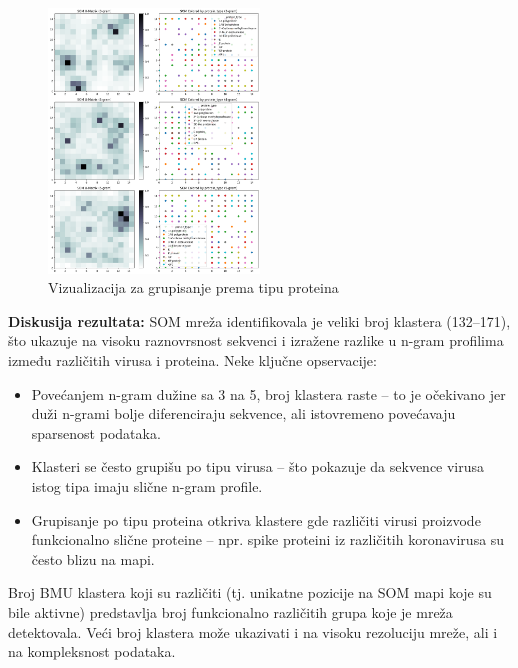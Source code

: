 \documentclass[a4paper,12pt]{article}
\begin{document}
\begin{figure}[h!]
    \centering
    \includegraphics[width=0.5\textwidth]{images/som-amino-acid-protein.png}
    \caption{Vizualizacija za grupisanje prema tipu proteina}
    \label{fig:som-struktura}
\end{figure}

\textbf{Diskusija rezultata:}
SOM mreža identifikovala je veliki broj klastera (132–171), što ukazuje na visoku raznovrsnost sekvenci i izražene razlike u n-gram profilima između različitih virusa i proteina. Neke ključne opservacije:

\begin{itemize}
    \item Povećanjem n-gram dužine sa 3 na 5, broj klastera raste – to je očekivano jer duži n-grami bolje diferenciraju sekvence, ali istovremeno povećavaju sparsenost podataka.
    \item Klasteri se često grupišu po tipu virusa – što pokazuje da sekvence virusa istog tipa imaju slične n-gram profile.
    \item Grupisanje po tipu proteina otkriva klastere gde različiti virusi proizvode funkcionalno slične proteine – npr. spike proteini iz različitih koronavirusa su često blizu na mapi.
\end{itemize}

Broj BMU klastera koji su različiti (tj. unikatne pozicije na SOM mapi koje su bile aktivne) predstavlja broj funkcionalno različitih grupa koje je mreža detektovala. Veći broj klastera može ukazivati i na visoku rezoluciju mreže, ali i na kompleksnost podataka.
\end{document}
